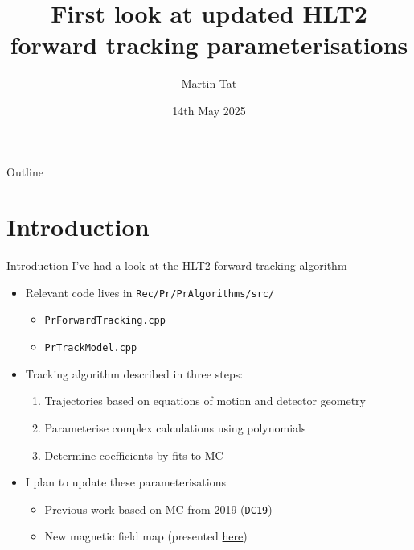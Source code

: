 \documentclass[xcolor={dvipsnames}]{beamer}
\title[Heidelberg tracking meeting]{First look at updated HLT2 forward tracking parameterisations}
\author[Martin Tat]{Martin Tat}
\institute[Heidelberg]{Heidelberg University}
\date{14th May 2025}
\begin{document}
\begin{frame}
  \titlepage
\end{frame}

\begin{frame}{Outline}
  \tableofcontents
\end{frame}

\section{Introduction}

\begin{frame}{Introduction}
  \vspace{0.0cm}
  {\Large I've had a look at the HLT2 forward tracking algorithm}
  \vspace{0.5cm}
  \begin{itemize}
    \setlength\itemsep{1.0em}
    \item{Relevant code lives in \texttt{Rec/Pr/PrAlgorithms/src/}}
    \begin{itemize}
      \item{\texttt{PrForwardTracking.cpp}}
      \item{\texttt{PrTrackModel.cpp}}
    \end{itemize}
    \item{Tracking algorithm described in three steps:}
    \begin{enumerate}
      \item{Trajectories based on equations of motion and detector geometry}
      \item{Parameterise complex calculations using polynomials}
      \item{Determine coefficients by fits to MC}
    \end{enumerate}
    \item{I plan to update these parameterisations}
    \begin{itemize}
      \item{Previous work based on MC from 2019 (\texttt{DC19})}
      \item{New magnetic field map (presented \href{https://indico.cern.ch/event/1539235/\#3-update-magnetic-field-map}{here})}
    \end{itemize}
  \end{itemize}
\end{frame}
\end{document}
